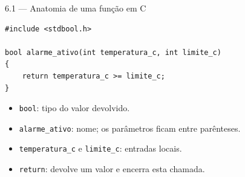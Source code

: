 \begin{frame}[fragile]{6.1 — Anatomia de uma função em C}
\begin{lstlisting}
#include <stdbool.h>

bool alarme_ativo(int temperatura_c, int limite_c)
{
    return temperatura_c >= limite_c;
}
\end{lstlisting}
\begin{itemize}
\item \texttt{bool}: tipo do valor devolvido.
\item \texttt{alarme\_ativo}: nome; os parâmetros ficam entre parênteses.
\item \texttt{temperatura\_c} e \texttt{limite\_c}: entradas locais.
\item \texttt{return}: devolve um valor e encerra esta chamada.
\end{itemize}
\end{frame}
